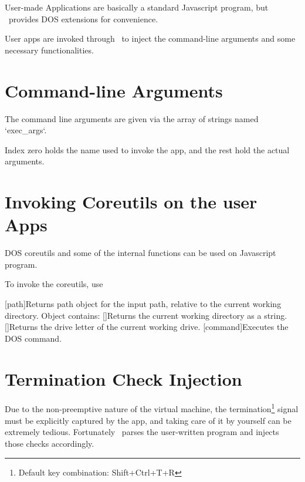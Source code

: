 User-made Applications are basically a standard Javascript program, but \thedos\ provides DOS extensions for convenience.

User apps are invoked through \thedos\ to inject the command-line arguments and some necessary functionalities.

\section{Command-line Arguments}

The command line arguments are given via the array of strings named `exec\_args`.

Index zero holds the name used to invoke the app, and the rest hold the actual arguments.


\section{Invoking Coreutils on the user Apps}

DOS coreutils and some of the internal functions can be used on Javascript program.

To invoke the coreutils, use 

\begin{outline}
\1[path]{Returns path object for the input path, relative to the current working directory. Object contains:}
 \2
 \2
 \2
 \2
\1[]{Returns the current working directory as a string.}
\1[]{Returns the drive letter of the current working drive.}
\1[command]{Executes the DOS command.}
\end{outline}


\section{Termination Check Injection}

Due to the non-preemptive nature of the virtual machine, the termination\footnote{Default key combination: Shift+Ctrl+T+R} signal must be explicitly captured by the app, and taking care of it by yourself can be extremely tedious. Fortunately \thedos\ parses the user-written program and injects those checks accordingly.

